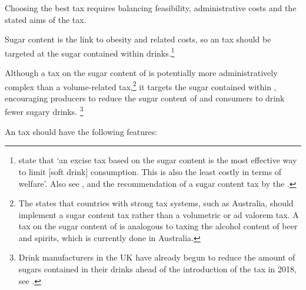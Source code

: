 \documentclass[embargoed]{grattan}
\begin{document}
Choosing the best \SSB{} tax requires balancing feasibility, administrative costs and the stated aims of the tax.

Sugar content is the link to obesity and related costs, so an \SSB{} tax should be targeted at the sugar contained within drinks.\footnote{\textcite{Bonnet2013Taxincidencestrategic} state that `an excise tax based on the sugar content is the most effective way to limit [soft drink] consumption.
This is also the least costly in terms of welfare'.
Also see \textcite{Smith2016SoftDrinksLevy}, \textcite{Organization2016FiscalPoliciesDiet} and the  recommendation of a sugar content tax by the \textcite{SouthAfricaNationalTreasury2016TaxationSugarSweetened}.}

Although a tax on the sugar content of \SSBs{} is potentially more administratively complex than a volume-related tax,\footnote{The \textcite{Organization2016FiscalPoliciesDiet} states that countries with strong tax systems, such as Australia, should implement a sugar content tax rather than a volumetric or ad valorem tax.
A tax on the sugar content of \SSBs{} is analogous to taxing the alcohol content of beer and spirits, which is currently done in Australia.} it targets the sugar contained within \SSBs{}, encouraging producers to reduce the sugar content of \SSBs{} and consumers to drink fewer sugary drinks.%
\footnote{Drink manufacturers in the UK have already begun to reduce the amount of sugars contained in their drinks ahead of the introduction of the \SSB{} tax in 2018, see \textcite{Team2016Sugarlevyworking}.}

An \SSB{} tax should have the following features:
\end{document}

